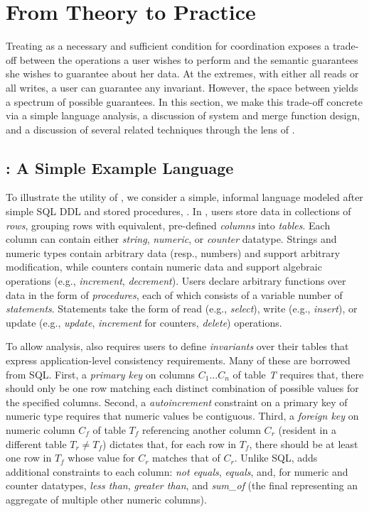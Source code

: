 
\section{From Theory to Practice}
\label{sec:bcc-practice}

Treating \iconfluence as a necessary and sufficient condition for
coordination exposes a trade-off between the operations a user wishes
to perform and the semantic guarantees she wishes to guarantee about
her data. At the extremes, with either all reads or all writes, a user
can guarantee any invariant. However, the space between yields a
spectrum of possible \iconfluent guarantees. In this section, we make
this trade-off concrete via a simple language analysis, a discussion
of system and merge function design, and a discussion of several
related techniques through the lens of \iconfluence.

\subsection{\lang: A Simple Example Language}

To illustrate the utility of \iconfluence, we consider a
simple, informal language modeled after simple SQL DDL and stored
procedures, \lang. In \lang, users store data in collections of
\textit{rows}, grouping rows with equivalent, pre-defined
\textit{columns} into \textit{tables}. Each column can contain either
\textit{string}, \textit{numeric}, or \textit{counter}
datatype. Strings and numeric types contain arbitrary data (resp.,
numbers) and support arbitrary modification, while counters contain
numeric data and support algebraic operations (e.g.,
\textit{increment}, \textit{decrement}). Users declare arbitrary
functions over data in the form of \textit{procedures}, each of which
consists of a variable number of \textit{statements}. Statements take
the form of read (e.g., \textit{select}), write (e.g.,
\textit{insert}), or update (e.g., \textit{update}, \textit{increment}
for counters, \textit{delete}) operations.

To allow \cfreedom analysis, \lang also requires users to define
\textit{invariants} over their tables that express application-level
consistency requirements. Many of these are borrowed from SQL. First,
a \textit{primary key} on columns $C_1 \dots C_n$ of table \textit{T}
requires that, there should only be one row matching each distinct
combination of possible values for the specified columns. Second, a
\textit{autoincrement} constraint on a primary key of numeric type
requires that numeric values be contiguous. Third, a \textit{foreign
  key} on numeric column $C_f$ of table $T_f$ referencing another
column $C_r$ (resident in a different table $T_r \neq T_f$) dictates
that, for each row in $T_f$, there should be at least one row in $T_f$
whose value for $C_r$ matches that of $C_r$. Unlike SQL, \lang adds
additional constraints to each column: \textit{not equals},
\textit{equals}, and, for numeric and counter datatypes, \textit{less
  than}, \textit{greater than}, and \textit{sum\_of} (the final
representing an aggregate of multiple other numeric columns).


